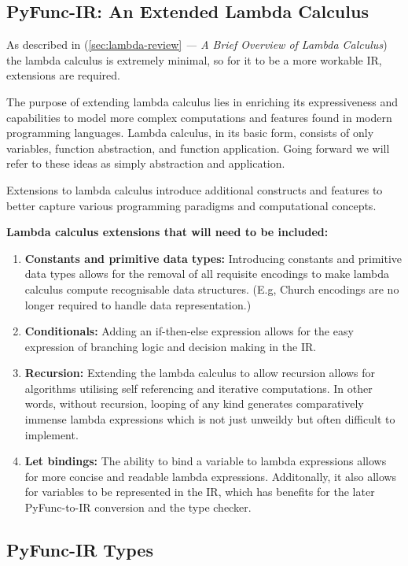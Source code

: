 \documentclass{l4proj}
\begin{document}
\subsection{PyFunc-IR: An Extended Lambda Calculus}
As described in (\ref{sec:lambda-review} \emph{— A Brief Overview of Lambda Calculus}) the lambda calculus is extremely minimal, so for it to be a more workable IR, extensions are required.

The purpose of extending lambda calculus lies in enriching its expressiveness and capabilities to model more complex computations and features found in modern programming languages.
Lambda calculus, in its basic form, consists of only variables, function abstraction, and function application.
Going forward we will refer to these ideas as simply abstraction and application.

Extensions to lambda calculus introduce additional constructs and features to better capture various programming paradigms and computational concepts.

\textbf{Lambda calculus extensions that will need to be included:}
\begin{enumerate}
    \item \textbf{Constants and primitive data types:} Introducing constants and primitive data types allows for the removal of all requisite encodings to make lambda calculus compute recognisable data structures. (E.g, Church encodings are no longer required to handle data representation.)
    \item \textbf{Conditionals:} Adding an if-then-else expression allows for the easy expression of branching logic and decision making in the IR.
    \item \textbf{Recursion:} Extending the lambda calculus to allow recursion allows for algorithms utilising self referencing and iterative computations.
    In other words, without recursion, looping of any kind generates comparatively immense lambda expressions which is not just unweildy but often difficult to implement.
    \item \textbf{Let bindings:} The ability to bind a variable to lambda expressions allows for more concise and readable lambda expressions.
    Additonally, it also allows for variables to be represented in the IR, which has benefits for the later PyFunc-to-IR conversion and the type checker. 
\end{enumerate}

\subsection{PyFunc-IR Types}
\end{document}
